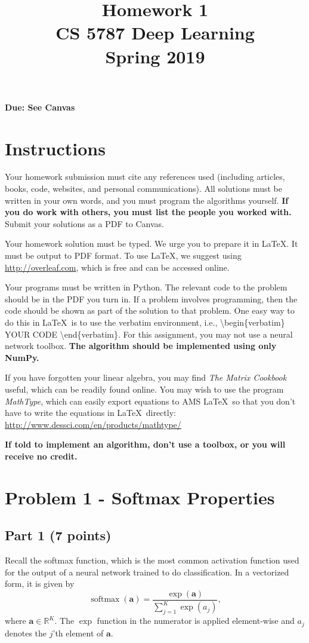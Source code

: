 \documentclass[11pt, oneside]{article}   	%
\title{Homework 1 \\ CS 5787 Deep Learning \\ Spring 2019}
\date{}
\begin{document}
\maketitle

\textbf{Due: See Canvas}

\section*{Instructions}

Your homework submission must cite any references used (including articles, books, code, websites, and personal communications).  All solutions must be written in your own words, and you must program the algorithms yourself. \textbf{If you do work with others, you must list the people you worked with.} Submit your solutions as a PDF to Canvas. 

Your homework solution must be typed. We urge you to prepare it in \LaTeX. It must be output to PDF format. To use \LaTeX, we suggest using \url{http://overleaf.com}, which is free and can be accessed online.

Your programs must be written in Python. The relevant code to the problem should be in the PDF you turn in. If a problem involves programming, then the code should be shown as part of the solution to that problem. One easy way to do this in \LaTeX \, is to use the verbatim environment, i.e., \textbackslash begin\{verbatim\} YOUR CODE \textbackslash end\{verbatim\}. For this assignment, you may not use a neural network toolbox. \textbf{The algorithm should be implemented using only NumPy.}

If you have forgotten your linear algebra, you may find  \textit{The Matrix Cookbook} useful, which can be readily found online. You may wish to use the program \textit{MathType}, which can easily export equations to AMS \LaTeX \, so that you don't have to write the equations in \LaTeX \, directly: \url{http://www.dessci.com/en/products/mathtype/}

\sloppy
\textbf{If told to implement an algorithm, don't use a toolbox, or you will receive no credit.}


\section*{Problem 1 - Softmax Properties}

\subsection*{Part 1 (7 points)}
Recall the softmax function, which is the most common activation function used for the output of a neural network trained to do classification. In a vectorized form, it is given by
\begin{equation*}
\operatorname{softmax} \left( {\mathbf{a}} \right) = \frac{{\exp \left( {\mathbf{a}} \right)}}
{{\sum\nolimits_{j = 1}^K {\exp \left( {a_j } \right)} }},
\end{equation*}
where $\mathbf{a}\in \mathbb{R}^K$. The $\exp$ function in the numerator is applied element-wise and $a_j$ denotes the $j$'th element of $\mathbf{a}$.
\end{document}
